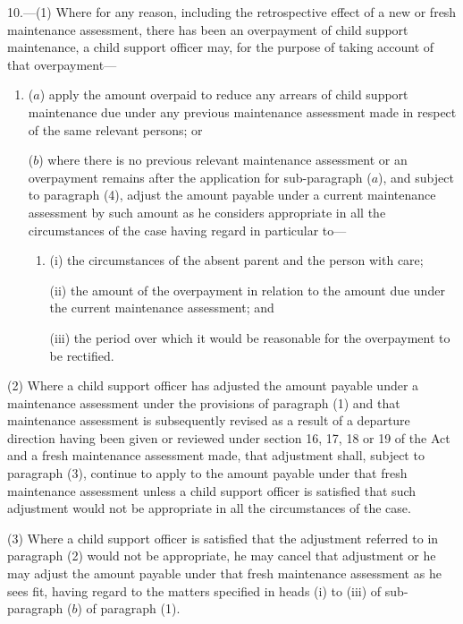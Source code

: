 \documentclass[12pt,a4paper]{article}
\begin{document}
10.—(1) Where for any reason, including the retrospective effect of a new or fresh maintenance assessment, there has been an overpayment of child support maintenance, a child support officer may, for the purpose of taking account of that overpayment—
\begin{enumerate}\item[]
($a$) apply the amount overpaid to reduce any arrears of child support maintenance due under any previous maintenance assessment made in respect of the same relevant persons; or

($b$) where there is no previous relevant maintenance assessment or an overpayment remains after the application for sub-paragraph ($a$), and subject to paragraph (4), adjust the amount payable under a current maintenance assessment by such amount as he considers appropriate in all the circumstances of the case having regard in particular to—
\begin{enumerate}\item[]
(i) the circumstances of the absent parent and the person with care;

\begin{sloppypar}
(ii) the amount of the overpayment in relation to the amount due under the current maintenance assessment; and
\end{sloppypar}

(iii) the period over which it would be reasonable for the overpayment to be rectified.
\end{enumerate}
\end{enumerate}

(2) Where a child support officer has adjusted the amount payable under a maintenance assessment under the provisions of paragraph (1) and that maintenance assessment is subsequently 
revised as a result of a departure direction having been given or  %
reviewed under section 16, 17, 18 or 19 of the Act and a fresh maintenance assessment made, that adjustment shall, subject to paragraph (3), continue to apply to the amount payable under that fresh maintenance assessment unless a child support officer is satisfied that such adjustment would not be appropriate in all the circumstances of the case.

(3) Where a child support officer is satisfied that the adjustment referred to in paragraph (2) would not be appropriate, he may cancel that adjustment or he may adjust the amount payable under that fresh maintenance assessment as he sees fit, having regard to the matters specified in heads (i) to (iii) of sub-paragraph ($b$) of paragraph (1).
\end{document}
